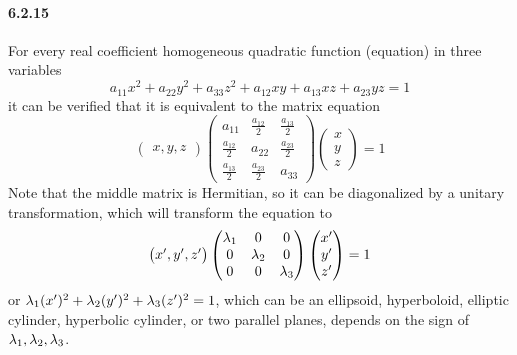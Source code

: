 \documentclass[a4paper]{article}
\begin{document}
\paragraph{6.2.15}
\renewcommand{\arraystretch}{1.5}
For every real coefficient homogeneous quadratic function (equation) in three variables \[a_{11}x^2+a_{22}y^2+a_{33}z^2+a_{12}xy+a_{13}xz+a_{23}yz=1\]
it can be verified that it is equivalent to the matrix equation 
\[
\begin{pmatrix}
x,y,z
\end{pmatrix}
\begin{pmatrix}
a_{11}&\frac{a_{12}}{2}&\frac{a_{13}}{2}\\
\frac{a_{12}}{2}&a_{22}&\frac{a_{23}}{2}\\
\frac{a_{13}}{2}&\frac{a_{23}}{2}&a_{33}
\end{pmatrix}
\begin{pmatrix}
x\\y\\z
\end{pmatrix}=1
\]
Note that the middle matrix is Hermitian, so it can be diagonalized by a unitary transformation, which will transform the equation to 
\[
\begin{pmatrix}
x',y',z'
\end{pmatrix}
\begin{pmatrix}
\lambda_1&0&0\\
0&\lambda_2&0\\
0&0&\lambda_3
\end{pmatrix}
\begin{pmatrix}
x'\\y'\\z'
\end{pmatrix}=1
\]
or $\lambda_1(x')^2+\lambda_2(y')^2+\lambda_3(z')^2=1$, which can be an ellipsoid, hyperboloid, elliptic cylinder, hyperbolic cylinder, or two parallel planes, depends on the sign of $\lambda_1,\lambda_2,\lambda_3$.
\end{document}
